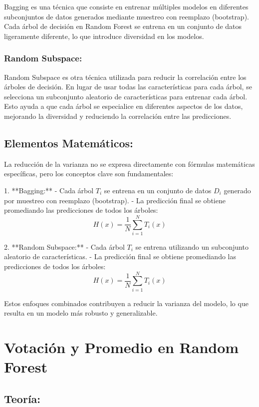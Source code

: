 \documentclass[12pt]{article}
\begin{document}
Bagging es una técnica que consiste en entrenar múltiples modelos en diferentes subconjuntos de datos generados mediante muestreo con reemplazo (bootstrap). Cada árbol de decisión en Random Forest se entrena en un conjunto de datos ligeramente diferente, lo que introduce diversidad en los modelos.

\subsubsection{Random Subspace:}

Random Subspace es otra técnica utilizada para reducir la correlación entre los árboles de decisión. En lugar de usar todas las características para cada árbol, se selecciona un subconjunto aleatorio de características para entrenar cada árbol. Esto ayuda a que cada árbol se especialice en diferentes aspectos de los datos, mejorando la diversidad y reduciendo la correlación entre las predicciones.

\subsection{Elementos Matemáticos:}

La reducción de la varianza no se expresa directamente con fórmulas matemáticas específicas, pero los conceptos clave son fundamentales:

1. **Bagging:**
    - Cada árbol \(T_i\) se entrena en un conjunto de datos \(D_i\) generado por muestreo con reemplazo (bootstrap).
    - La predicción final se obtiene promediando las predicciones de todos los árboles:
        \[ H(x) = \frac{1}{N} \sum_{i=1}^{N} T_i(x) \]

2. **Random Subspace:**
    - Cada árbol \(T_i\) se entrena utilizando un subconjunto aleatorio de características.
    - La predicción final se obtiene promediando las predicciones de todos los árboles:
        \[ H(x) = \frac{1}{N} \sum_{i=1}^{N} T_i(x) \]

Estos enfoques combinados contribuyen a reducir la varianza del modelo, lo que resulta en un modelo más robusto y generalizable.

\section{Votación y Promedio en Random Forest}

\subsection{Teoría:}
\end{document}
